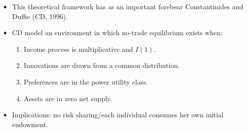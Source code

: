 \documentclass[notes=show]{beamer}
\begin{document}
\begin{frame}%



\begin{itemize}
\item This theoretical framework has as an important forebear Constantinides
and Duffie (CD, 1996).

\item CD model an environment in which no-trade equilibrium exists when:

\begin{enumerate}
\item Income process is multiplicative and $I\left( 1\right) $.

\item Innovations are drawn from a common distribution. 

\item Preferences are in the power utility class. 

\item Assets are in zero net supply.
\end{enumerate}

\item Implications: no risk sharing/each individual consumes her own initial
endowment.
\end{itemize}

\transboxout%
\end{frame}%

\bigskip 
\end{document}
